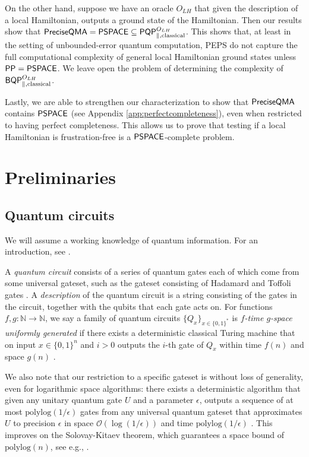 \documentclass[11pt]{article}
\theoremstyle{definition}
\theoremstyle{remark}
\theoremstyle{definition}
\newcommand\PSPACE{{\sf{PSPACE}}}
\newcommand\PP{\sf{PP}}
\newcommand\BQP{{\sf{BQP}}}
\newcommand\PQP{{\sf{PQP}}}
\newcommand\QMAexp{{\sf{PreciseQMA}}}
\newcommand\bigoh{\mathcal{O}}
\newcommand{\polylog}{\textrm{polylog}}
\begin{document}
On the other hand, suppose we have an oracle $O_{LH}$ that given the description of a local Hamiltonian, outputs a ground state of the Hamiltonian. Then our results show that $\QMAexp = \PSPACE \subseteq \PQP^{O_{LH}}_{\parallel,\text{classical}}$. This shows that, at least in the setting of unbounded-error quantum computation, PEPS do not capture the full computational complexity of general local Hamiltonian ground states unless $\PP=\PSPACE$. We leave open the problem of determining the complexity of $\BQP^{O_{LH}}_{\parallel,\text{classical}}$.

Lastly, we are able to strengthen our characterization to show that $\QMAexp$ contains $\PSPACE$ (see Appendix \ref{app:perfectcompleteness}), even when restricted to having perfect completeness.  This allows us to prove that testing if a local Hamiltonian is frustration-free is a $\PSPACE$-complete problem.  
 \section{Preliminaries}
\subsection{Quantum circuits}
We will assume a working knowledge of quantum information. For an introduction, see \cite{nc00}.

A \emph{quantum circuit} consists of a series of quantum gates each of which come from some universal gateset, such as the gateset consisting of Hadamard and Toffoli gates \cite{shi}.  A \emph{description} of the quantum circuit is a string consisting of the gates in the circuit, together with the qubits that each gate acts on.
 For functions $f,g:\mathbb{N}\rightarrow\mathbb{N}$, we say a family of quantum circuits $\{Q_x\}_{x\in\{0,1\}^*}$ is \emph{$f$-time $g$-space uniformly generated} if there exists a deterministic classical Turing machine that on input $x\in\{0,1\}^n$ and $i>0$ outputs the $i$-th gate of $Q_x$ within time $f(n)$ and space $g(n)$ \cite{nc00}.  
 
 We also note that our restriction to a specific gateset is without loss of generality, even for logarithmic space algorithms:  there exists a deterministic algorithm that given any unitary quantum gate $U$ and a parameter $\epsilon$, outputs a sequence of at most $\polylog({1/\epsilon})$ gates from any universal quantum gateset that approximates $U$ to precision $\epsilon$ in space $\bigoh({\log({1/\epsilon})})$ and time $\polylog({1/\epsilon})$ \cite{mw12}.  This improves on the Solovay-Kitaev theorem, which guarantees a space bound of $\polylog(n)$, see e.g., \cite{nc00}.
 
\end{document}
